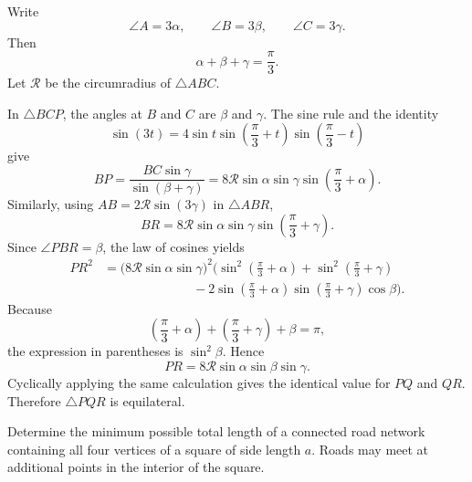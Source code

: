     \begin{solution}
        Write
        \[
            \angle A=3\alpha,
            \qquad
            \angle B=3\beta,
            \qquad
            \angle C=3\gamma.
        \]
        Then
        \[
            \alpha+\beta+\gamma=\frac{\pi}{3}.
        \]
        Let $\mathcal{R}$ be the circumradius of $\triangle ABC$.

        In $\triangle BCP$, the angles at $B$ and $C$ are $\beta$ and
        $\gamma$. The sine rule and the identity
        \[
            \sin(3t)
            =
            4\sin t\sin\left(\frac{\pi}{3}+t\right)
            \sin\left(\frac{\pi}{3}-t\right)
        \]
        give
        \[
            BP
            =
            \frac{BC\sin\gamma}{\sin(\beta+\gamma)}
            =
            8\mathcal{R}\sin\alpha\sin\gamma
            \sin\left(\frac{\pi}{3}+\alpha\right).
        \]
        Similarly, using $AB=2\mathcal{R}\sin(3\gamma)$ in
        $\triangle ABR$,
        \[
            BR
            =
            8\mathcal{R}\sin\alpha\sin\gamma
            \sin\left(\frac{\pi}{3}+\gamma\right).
        \]
        Since $\angle PBR=\beta$, the law of cosines yields
        \[
            \begin{aligned}
                PR^2
                &=
                \bigl(8\mathcal{R}\sin\alpha\sin\gamma\bigr)^2
                \Biggl(
                    \sin^2\left(\frac{\pi}{3}+\alpha\right)
                    +
                    \sin^2\left(\frac{\pi}{3}+\gamma\right)\\
                &\hspace{7em}
                    -2
                    \sin\left(\frac{\pi}{3}+\alpha\right)
                    \sin\left(\frac{\pi}{3}+\gamma\right)
                    \cos\beta
                \Biggr).
            \end{aligned}
        \]
        Because
        \[
            \left(\frac{\pi}{3}+\alpha\right)
            +
            \left(\frac{\pi}{3}+\gamma\right)
            +\beta
            =
            \pi,
        \]
        the expression in parentheses is $\sin^2\beta$. Hence
        \[
            PR
            =
            8\mathcal{R}\sin\alpha\sin\beta\sin\gamma.
        \]
        Cyclically applying the same calculation gives the identical value for
        $PQ$ and $QR$. Therefore $\triangle PQR$ is equilateral.
    \end{solution}

    \begin{expectedproblem}
        Determine the minimum possible total length of a connected road network
        containing all four vertices of a square of side length $a$. Roads may
        meet at additional points in the interior of the square.
    \end{expectedproblem}

